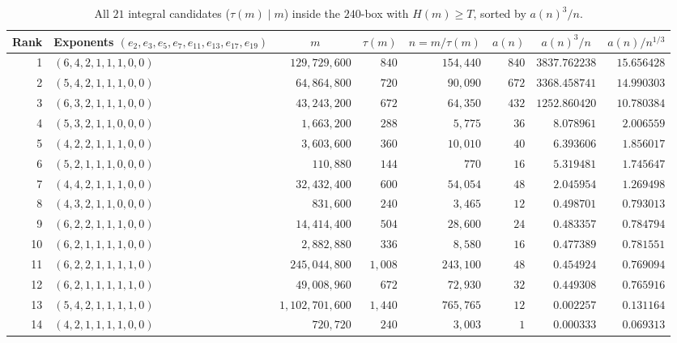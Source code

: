 \documentclass[11pt,a4paper]{article}
\theoremstyle{definition}
\theoremstyle{remark}
\begin{document}
\begin{table}[htbp]
\centering
\caption{All $21$ integral candidates ($\tau(m) \mid m$) inside the $240$-box with $H(m) \ge T$, sorted by $a(n)^3/n$.}
\label{tab:21-candidates}
{\scriptsize
\setlength{\tabcolsep}{4pt}
\begin{tabular}{@{}rlrrrrrr@{}}
\toprule
Rank & Exponents $(e_2,e_3,e_5,e_7,e_{11},e_{13},e_{17},e_{19})$ & \multicolumn{1}{c}{$m$} & \multicolumn{1}{c}{$\tau(m)$} & \multicolumn{1}{c}{$n = m/\tau(m)$} & \multicolumn{1}{c}{$a(n)$} & \multicolumn{1}{c}{$a(n)^3/n$} & \multicolumn{1}{c}{$a(n)/n^{1/3}$} \\
\midrule
1 & $(6,4,2,1,1,1,0,0)$ & $129{,}729{,}600$ & $840$ & $154{,}440$ & $840$ & $3837.762238$ & $15.656428$ \\
2 & $(5,4,2,1,1,1,0,0)$ & $64{,}864{,}800$ & $720$ & $90{,}090$ & $672$ & $3368.458741$ & $14.990303$ \\
3 & $(6,3,2,1,1,1,0,0)$ & $43{,}243{,}200$ & $672$ & $64{,}350$ & $432$ & $1252.860420$ & $10.780384$ \\
4 & $(5,3,2,1,1,0,0,0)$ & $1{,}663{,}200$ & $288$ & $5{,}775$ & $36$ & $8.078961$ & $2.006559$ \\
5 & $(4,2,2,1,1,1,0,0)$ & $3{,}603{,}600$ & $360$ & $10{,}010$ & $40$ & $6.393606$ & $1.856017$ \\
6 & $(5,2,1,1,1,0,0,0)$ & $110{,}880$ & $144$ & $770$ & $16$ & $5.319481$ & $1.745647$ \\
7 & $(4,4,2,1,1,1,0,0)$ & $32{,}432{,}400$ & $600$ & $54{,}054$ & $48$ & $2.045954$ & $1.269498$ \\
8 & $(4,3,2,1,1,0,0,0)$ & $831{,}600$ & $240$ & $3{,}465$ & $12$ & $0.498701$ & $0.793013$ \\
9 & $(6,2,2,1,1,1,0,0)$ & $14{,}414{,}400$ & $504$ & $28{,}600$ & $24$ & $0.483357$ & $0.784794$ \\
10 & $(6,2,1,1,1,1,0,0)$ & $2{,}882{,}880$ & $336$ & $8{,}580$ & $16$ & $0.477389$ & $0.781551$ \\
11 & $(6,2,2,1,1,1,1,0)$ & $245{,}044{,}800$ & $1{,}008$ & $243{,}100$ & $48$ & $0.454924$ & $0.769094$ \\
12 & $(6,2,1,1,1,1,1,0)$ & $49{,}008{,}960$ & $672$ & $72{,}930$ & $32$ & $0.449308$ & $0.765916$ \\
13 & $(5,4,2,1,1,1,1,0)$ & $1{,}102{,}701{,}600$ & $1{,}440$ & $765{,}765$ & $12$ & $0.002257$ & $0.131164$ \\
14 & $(4,2,1,1,1,1,0,0)$ & $720{,}720$ & $240$ & $3{,}003$ & $1$ & $0.000333$ & $0.069313$ \\

\end{tabular}}
\end{table}
\end{document}
